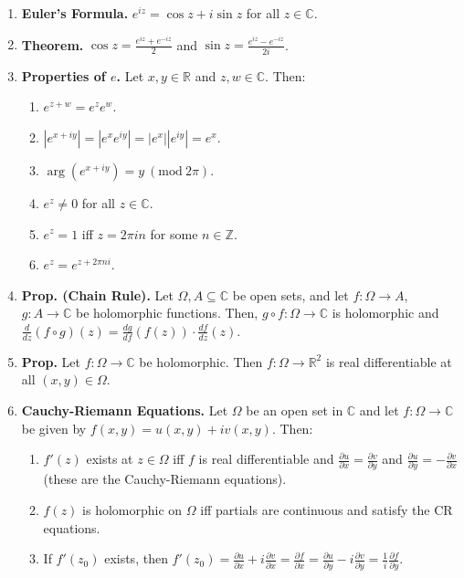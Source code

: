 \documentclass[11pt]{article}
\theoremstyle{definition}
\theoremstyle{named}
\newcommand{\Mod}[1]{\ (\mathrm{mod}\ #1)}
\begin{document}
\begin{enumerate}
    \item \textbf{Euler's Formula. } $e^{iz} = \cos z + i\sin z$ for all $z \in \mathbb{C}$. 
    \item \textbf{Theorem. } $\cos z = \frac{e^{iz} + e^{-iz}}{2}$ and $\sin z = \frac{e^{iz} - e^{-iz}}{2i}$. 
    \item \textbf{Properties of $e$. } Let $x,y \in \mathbb{R}$ and $z,w \in \mathbb{C}$. Then: 
    \begin{enumerate}
        \item $e^{z + w} = e^ze^w$. 
        \item $|e^{x + iy}| = |e^xe^{iy}| = |e^x||e^{iy}| = e^x$. 
        \item $\arg(e^{x + iy}) = y \Mod{2\pi}$. 
        \item $e^z \neq 0$ for all $z \in \mathbb{C}$. 
        \item $e^z = 1$ iff $z = 2\pi in$ for some $n \in \mathbb{Z}$. 
        \item $e^z = e^{z + 2\pi ni}$. 
    \end{enumerate} 
    \item \textbf{Prop. (Chain Rule). } Let $\Omega, A \subseteq \mathbb{C}$ be open sets, and let $f: \Omega \to A$, $g: A \to \mathbb{C}$ be holomorphic functions. Then, $g \circ f: \Omega \to \mathbb{C}$ is holomorphic and $\frac{d}{dz}(f \circ g)(z) = \frac{dg}{df}(f(z)) \cdot \frac{df}{dz}(z)$. 
    \item \textbf{Prop. } Let $f: \Omega \to \mathbb{C}$ be holomorphic. Then $f: \Omega \to \mathbb{R}^2$ is real differentiable at all $(x,y) \in \Omega$. 
    \item \textbf{Cauchy-Riemann Equations. } Let $\Omega$ be an open set in $\mathbb{C}$ and let $f: \Omega \to \mathbb{C}$ be given by $f(x,y) = u(x,y) + iv(x,y)$. Then: 
    \begin{enumerate}
        \item $f'(z)$ exists at $z \in \Omega$ iff $f$ is real differentiable and $\frac{\partial u}{\partial x} = \frac{\partial v}{\partial y}$ and $\frac{\partial u}{\partial y} = -\frac{\partial v}{\partial x}$ (these are the Cauchy-Riemann equations). 
        \item $f(z)$ is holomorphic on $\Omega$ iff partials are continuous and satisfy the CR equations. 
        \item If $f'(z_0)$ exists, then $f'(z_0) = \frac{\partial u}{\partial x} + i\frac{\partial v}{\partial x} = \frac{\partial f}{\partial x} = \frac{\partial u}{\partial y} - i\frac{\partial v}{\partial y} = \frac{1}{i}\frac{\partial f}{\partial y}$. 

\end{enumerate}
\end{enumerate}
\end{document}
